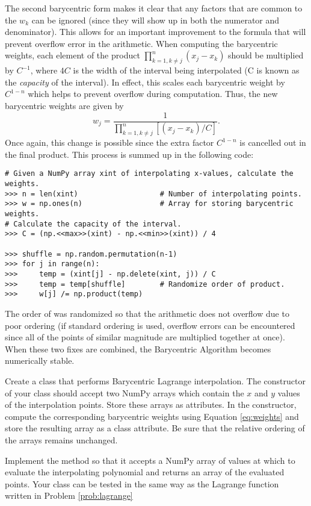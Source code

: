 The second barycentric form makes it clear that any factors that are common to the $w_k$ can be ignored (since they will show up in both the numerator and denominator).
This allows for an important improvement to the formula that will prevent overflow error in the arithmetic.
When computing the barycentric weights, each element of the product $\prod_{k=1, k \neq j}^n (x_j-x_k)$ should be multiplied by $C^{-1}$, where $4C$ is the width of the interval being interpolated
(C is known as the \emph{capacity} of the interval).
In effect, this scales each barycentric weight by $C^{1-n}$ which helps to prevent overflow during computation.
Thus, the new barycentric weights are given by
\begin{equation}
\label{eq:weights}
w_j = \frac{1}{\prod_{k=1, k \neq j}^n \left[(x_j-x_k) / C\right]}.
\end{equation}
Once again, this change is possible since the extra factor $C^{1-n}$ is cancelled out in the final product.
This process is summed up in the following code:

\begin{lstlisting}
# Given a NumPy array xint of interpolating x-values, calculate the weights.
>>> n = len(xint)                   # Number of interpolating points.
>>> w = np.ones(n)                  # Array for storing barycentric weights.
# Calculate the capacity of the interval.
>>> C = (np.<<max>>(xint) - np.<<min>>(xint)) / 4

>>> shuffle = np.random.permutation(n-1)
>>> for j in range(n):
>>>     temp = (xint[j] - np.delete(xint, j)) / C
>>>     temp = temp[shuffle]        # Randomize order of product.
>>>     w[j] /= np.product(temp)
\end{lstlisting}

The order of  was randomized so that the arithmetic does not overflow due to poor ordering (if standard ordering is used, overflow errors can be encountered since all
of the points of similar magnitude are multiplied together at once).
When these two fixes are combined, the Barycentric Algorithm becomes numerically stable.

\begin{problem}
\label{prob:barycentric}
Create a class that performs Barycentric Lagrange interpolation.
The constructor of your class should accept two NumPy arrays which contain the $x$ and $y$ values of the interpolation points.
Store these arrays as attributes.
In the constructor, compute the corresponding barycentric weights using Equation \ref{eq:weights} and store the resulting array as a class attribute.
Be sure that the relative ordering of the arrays remains unchanged.

Implement the  method so that it accepts a NumPy array of values at which to evaluate the interpolating polynomial and returns an array of the evaluated points.
Your class can be tested in the same way as the Lagrange function written in Problem \ref{prob:lagrange}
\end{problem}

